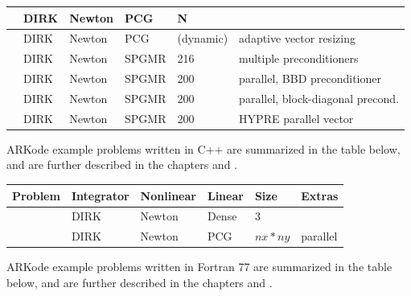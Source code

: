 \documentclass[letterpaper,10pt,english]{sphinxmanual}
\begin{document}
\begin{tabulary}{\linewidth}{|L|L|L|L|L|L|}
{\hyperref[c_serial:ark-heat1d]{\emph{}}}
 & 
DIRK
 & 
Newton
 & 
PCG
 & 
N
 & \\
\hline
{\hyperref[c_serial:ark-heat1d-adapt]{\emph{}}}
 & 
DIRK
 & 
Newton
 & 
PCG
 & 
(dynamic)
 & 
adaptive vector resizing
\\
\hline
{\hyperref[c_serial:ark-krylovdemo-prec]{\emph{}}}
 & 
DIRK
 & 
Newton
 & 
SPGMR
 & 
216
 & 
multiple preconditioners
\\
\hline
{\hyperref[c_parallel:ark-diurnal-kry-bbd-p]{\emph{}}}
 & 
DIRK
 & 
Newton
 & 
SPGMR
 & 
200
 & 
parallel, BBD preconditioner
\\
\hline
{\hyperref[c_parallel:ark-diurnal-kry-p]{\emph{}}}
 & 
DIRK
 & 
Newton
 & 
SPGMR
 & 
200
 & 
parallel, block-diagonal precond.
\\
\hline
{\hyperref[c_parhyp:ark-diurnal-kry-ph]{\emph{}}}
 & 
DIRK
 & 
Newton
 & 
SPGMR
 & 
200
 & 
HYPRE parallel vector
\\
\hline\end{tabulary}


ARKode example problems written in C++ are summarized in the table
below, and are further described in the chapters {\hyperref[cpp_serial:serial-cpp]{\emph{}}} and
{\hyperref[cpp_parallel:parallel-cpp]{\emph{}}}.

\begin{tabulary}{\linewidth}{|L|L|L|L|L|L|}
\hline
\textsf{\relax 
Problem
} & \textsf{\relax 
Integrator
} & \textsf{\relax 
Nonlinear
} & \textsf{\relax 
Linear
} & \textsf{\relax 
Size
} & \textsf{\relax 
Extras
}\\
\hline
{\hyperref[cpp_serial:ark-analytic-sys]{\emph{}}}
 & 
DIRK
 & 
Newton
 & 
Dense
 & 
3
 & \\
\hline
{\hyperref[cpp_parallel:ark-heat2d]{\emph{}}}
 & 
DIRK
 & 
Newton
 & 
PCG
 & 
\(nx*ny\)
 & 
parallel
\\
\hline\end{tabulary}


ARKode example problems written in Fortran 77 are summarized in the table
below, and are further described in the chapters {\hyperref[f77_serial:serial-f77]{\emph{}}} and
{\hyperref[f77_parallel:parallel-f77]{\emph{}}}.
\end{document}
